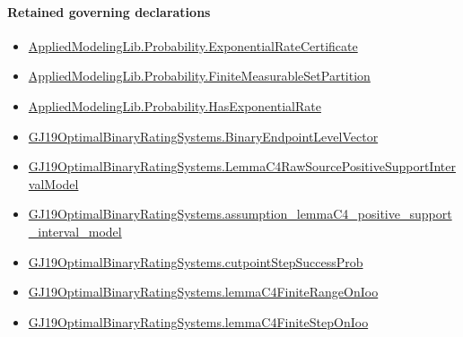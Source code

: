 \documentclass[10pt]{article}
\begin{document}
\paragraph{Retained governing declarations}
\begin{itemize}\raggedright
\item \hyperlink{governing-declaration-330a08568e50e95e}{Applied\allowbreak{}Modeling\allowbreak{}Lib.\allowbreak{}Probability.\allowbreak{}Exponential\allowbreak{}Rate\allowbreak{}Certificate}
\item \hyperlink{governing-declaration-774cb983dcb50264}{Applied\allowbreak{}Modeling\allowbreak{}Lib.\allowbreak{}Probability.\allowbreak{}Finite\allowbreak{}Measurable\allowbreak{}Set\allowbreak{}Partition}
\item \hyperlink{governing-declaration-e023a17eef63c747}{Applied\allowbreak{}Modeling\allowbreak{}Lib.\allowbreak{}Probability.\allowbreak{}Has\allowbreak{}Exponential\allowbreak{}Rate}
\item \hyperlink{governing-declaration-aa797f827cdcda67}{GJ19\allowbreak{}Optimal\allowbreak{}Binary\allowbreak{}Rating\allowbreak{}Systems.\allowbreak{}Binary\allowbreak{}Endpoint\allowbreak{}Level\allowbreak{}Vector}
\item \hyperlink{governing-declaration-870f2f84b02a5b50}{GJ19\allowbreak{}Optimal\allowbreak{}Binary\allowbreak{}Rating\allowbreak{}Systems.\allowbreak{}Lemma\allowbreak{}C4\allowbreak{}Raw\allowbreak{}Source\allowbreak{}Positive\allowbreak{}Support\allowbreak{}Interval\allowbreak{}Model}
\item \hyperlink{governing-declaration-424ab0e3ff73559d}{GJ19\allowbreak{}Optimal\allowbreak{}Binary\allowbreak{}Rating\allowbreak{}Systems.\allowbreak{}assumption\_\allowbreak{}lemma\allowbreak{}C4\_\allowbreak{}positive\_\allowbreak{}support\_\allowbreak{}interval\_\allowbreak{}model}
\item \hyperlink{governing-declaration-a374e15760cb0711}{GJ19\allowbreak{}Optimal\allowbreak{}Binary\allowbreak{}Rating\allowbreak{}Systems.\allowbreak{}cutpoint\allowbreak{}Step\allowbreak{}Success\allowbreak{}Prob}
\item \hyperlink{governing-declaration-33c934dfa3d38c70}{GJ19\allowbreak{}Optimal\allowbreak{}Binary\allowbreak{}Rating\allowbreak{}Systems.\allowbreak{}lemma\allowbreak{}C4\allowbreak{}Finite\allowbreak{}Range\allowbreak{}On\allowbreak{}Ioo}
\item \hyperlink{governing-declaration-afc4f201aafadec9}{GJ19\allowbreak{}Optimal\allowbreak{}Binary\allowbreak{}Rating\allowbreak{}Systems.\allowbreak{}lemma\allowbreak{}C4\allowbreak{}Finite\allowbreak{}Step\allowbreak{}On\allowbreak{}Ioo}

\end{itemize}
\end{document}
